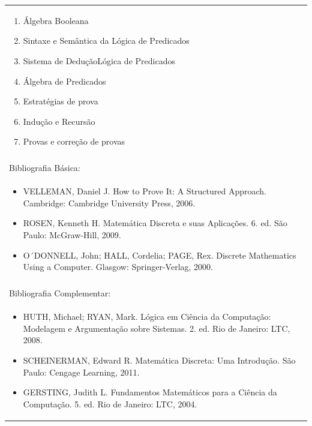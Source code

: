 \documentclass[11pt]{article}
\begin{document}
\begin{center}
\begin{longtable}{|p{4cm}|p{4cm}|p{4cm}|p{4cm}|}
{\begin{enumerate}
\item Álgebra Booleana
\item Sintaxe e Semântica da Lógica de Predicados
\item Sistema de DeduçãoLógica de Predicados
\item Álgebra de Predicados
\item Estratégias de prova
\item Indução e Recursão
\item Provas e correção de provas\end{enumerate}}\\
\multicolumn{4}{|p{16cm}|}{}\\
\hline
\multicolumn{4}{|p{16cm}|}{Bibliografia Básica:}\\
\multicolumn{4}{|p{16cm}|}{%
\begin{itemize}\item VELLEMAN, Daniel J. How to Prove It: A Structured Approach. Cambridge: Cambridge University Press, 2006.
\item ROSEN, Kenneth H. Matemática Discreta e suas Aplicações. 6. ed. São Paulo: McGraw-Hill, 2009.
\item O´DONNELL, John; HALL, Cordelia; PAGE, Rex. Discrete Mathematics Using a Computer. Glasgow: Springer-Verlag, 2000.\end{itemize}}\\
\multicolumn{4}{|p{16cm}|}{}\\
\hline
\multicolumn{4}{|p{16cm}|}{Bibliografia Complementar:}\\
\multicolumn{4}{|p{16cm}|}{%
\begin{itemize}\item HUTH, Michael; RYAN, Mark. Lógica em Ciência da Computação: Modelagem e Argumentação sobre Sistemas. 2. ed. Rio de Janeiro: LTC, 2008.
\item SCHEINERMAN, Edward R. Matemática Discreta: Uma Introdução. São Paulo: Cengage Learning, 2011.
\item GERSTING, Judith L. Fundamentos Matemáticos para a Ciência da Computação. 5. ed. Rio de Janeiro: LTC, 2004.\end{itemize}}\\
\hline
\end{longtable}
\end{center}
\end{document}
